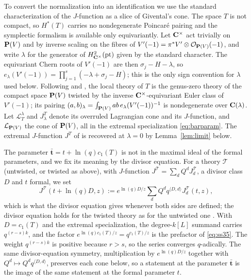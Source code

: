 To convert the normalization into an identification we use the standard
characterization of the \(J\)-function as a slice of Givental's cone.  The
space \(T\) is not compact, so \(H^{*}(T)\) carries no nondegenerate
Poincar\'e pairing and the symplectic formalism is available only
equivariantly.  Let \(\mathbf C^{\times}\) act trivially on \(\mathbf P(V)\) and by inverse
scaling on the fibres of \(V'(-1)=\pi^{*}V'\otimes\mathcal O_{\mathbf P(V)}(-1)\),
and write \(\lambda\) for the generator of \(H^{2}_{\mathbf C^{\times}}(\mathrm{pt})\)
given by the standard character.  The equivariant Chern roots of \(V'(-1)\)
are then \(\sigma_{j}-H-\lambda\), so
\(e_{\lambda}(V'(-1))=\prod_{j=1}^{s}(-\lambda+\sigma_{j}-H)\); this is the
only sign convention for \(\lambda\) used below.  Following
\cite{CoatesGivental} and \cite{CCIT}, the local theory of \(T\) is
the genus-zero theory of the compact space \(\mathbf P(V)\) twisted by the inverse
\(\mathbf C^{\times}\)-equivariant Euler class of \(V'(-1)\); its pairing
\((a,b)_{\lambda}=\int_{\mathbf P(V)}ab\,e_{\lambda}(V'(-1))^{-1}\) is
nondegenerate over \(\mathbf C(\lambda)\).  Let \(\mathcal L_{T}^{\lambda}\) and
\(J^{T}_{\lambda}\) denote its overruled Lagrangian cone and its
\(J\)-function, and \(\mathcal L_{\mathbf P(V)}\) the cone of \(\mathbf P(V)\), all in
the extremal specialization \eqref{eq:barparam}.  The extremal
\(J\)-function \(J^{T}\) of \cite{SS} is recovered at \(\lambda=0\) by
Lemma~\ref{lem:limit} below.

The parameter \(\bar{\mathbf t}=t+\ln(q)c_{1}(T)\) is not in the maximal
ideal of the formal parameters, and we fix its meaning by the divisor
equation.  For a theory \(\mathcal T\) (untwisted, or twisted as above),
with \(J\)-function \(J^{\mathcal T}=\sum_{d}Q^{d}J^{\mathcal T}_{d}\), a
divisor class \(D\) and \(t\) formal, we set
\begin{equation}
  \label{eq:lnq}
  J^{\mathcal T}(t+\ln(q)D,z)
  :=e^{\ln(q)D/z}\sum_{d}Q^{d}q^{\langle D,d\rangle}J^{\mathcal T}_{d}(t,z),
\end{equation}
which is what the divisor equation gives whenever both sides are defined; the
divisor equation holds for the twisted theory as for the untwisted one
\cite{CoatesGivental}.  With \(D=c_{1}(T)\) and the extremal specialization,
the degree-\(k[L]\) summand carries \(q^{(r-s)k}\), and the factor
\(e^{\ln(q)c_{1}(T)/z}=q^{c_{1}(T)/z}\) is the prefactor of
\eqref{eq:ss35}.  The weight \(q^{(r-s)k}\) is positive because \(r>s\), so
the series converges \(q\)-adically.  The same divisor-equation symmetry,
multiplication by \(e^{\ln(q)D/z}\) together with \(Q^{d}\mapsto
Q^{d}q^{\langle D,d\rangle}\), preserves each cone below, so a statement at
the parameter \(\bar{\mathbf t}\) is the image of the same statement at the
formal parameter \(t\).

